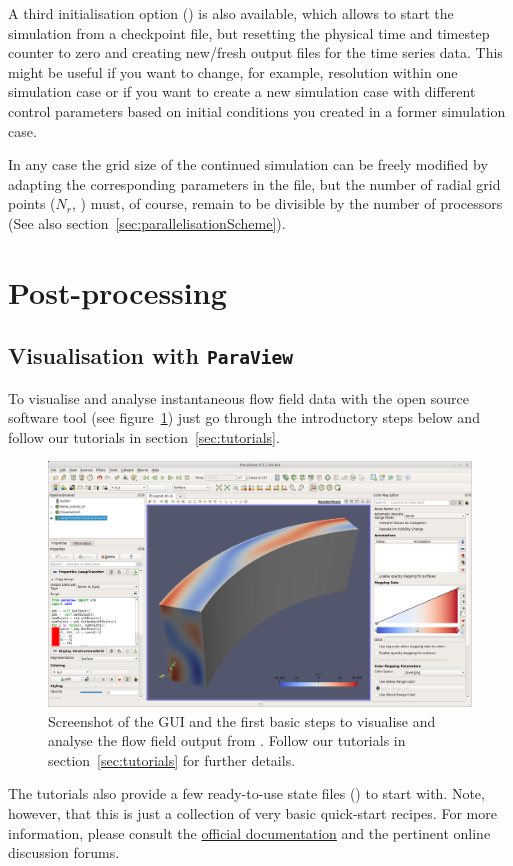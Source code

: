 \documentclass[a4paper, 11pt, DIV=11]{scrartcl}
\begin{document}
A third initialisation option () is also available, which allows
to start the simulation from a checkpoint file, but resetting the physical time
and timestep counter to zero and creating new/fresh output files for the time
series data. This might be useful if you want to change, for example, resolution
within one simulation case or if you want to create a new simulation case with
different control parameters based on initial conditions you created in a former
simulation case.
\par
In any case the grid size of the continued simulation can be freely modified by
adapting the corresponding parameters in the  file, but the
number of radial grid points ($N_r$, ) must, of course, remain to be
divisible by the number of processors (See also section~\ref{sec:parallelisationScheme}).



\section{Post-processing}

\subsection{Visualisation with \texttt{\textbf{ParaView}}}
\label{sec:paraview}

To visualise and analyse instantaneous flow field data with the open source software
tool \paraview (see figure~\ref{fig:paraViewFlowField}) just go through the introductory
steps below and follow our tutorials in section~\ref{sec:tutorials}.
\begin{figure}[htb]
\includegraphics[width=1.00\linewidth]{figures/paraViewFlowField.png}
\caption{Screenshot of the \paraview GUI and the first basic steps to
visualise and analyse the \hdf flow field output from \nsc. Follow our
tutorials in section~\ref{sec:tutorials} for further details.}
\label{fig:paraViewFlowField}
\end{figure}
The tutorials also provide a few ready-to-use state files ()
to start with. Note, however, that this is just a collection of very
basic quick-start recipes. For more information, please consult the
\href{https://www.paraview.org/Wiki/The_ParaView_Tutorial}{official documentation}
\cite{Moreland2018} and the pertinent online discussion forums.
\end{document}
